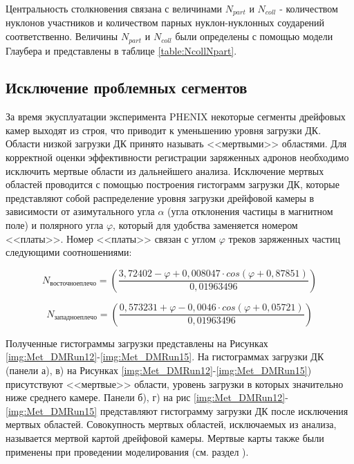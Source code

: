 Центральность столкновения связана с величинами $N_{part}$ и $N_{coll}$ - количеством нуклонов участников и количеством парных нуклон-нуклонных соударений соответственно. Величины $N_{part}$ и $N_{coll}$ были определены с помощью модели Глаубера и представлены в таблице \ref{table:NcollNpart}.

\subsection{Исключение проблемных сегментов} \label{sect3_DM}
За время экусплуатации эксперимента PHENIX некоторые сегменты дрейфовых камер выходят из строя, что приводит к уменьшению уровня загрузки ДК. Области низкой загрузки ДК принято называть <<мертвыми>> областями. 
Для корректной оценки эффективности регистрации заряженных адронов необходимо исключить мертвые области из дальнейшего анализа. 
Исключение мертвых областей проводится с помощью построения гистограмм загрузки ДК, которые представляют собой распределение уровня загрузки дрейфовой камеры в зависимости от азимутального угла $\alpha$ (угла отклонения частицы в магнитном поле) и полярного угла $\varphi$, который для удобства заменяется номером <<платы>>. Номер <<платы>> связан с углом $\varphi$ треков заряженных частиц следующими соотношениями: 

\begin{equation}
	N_{восточное плечо} = \left( \frac{3,72402 - \varphi + 0,008047 \cdot cos(\varphi + 0,87851)}{0,01963496} \right)
\end{equation}


\begin{equation}
	N_{западное плечо} = \left( \frac{0,573231 + \varphi - 0,0046 \cdot cos(\varphi + 0,05721)}{0,01963496} \right)
\end{equation}

Полученные гистограммы загрузки представлены на Рисунках \ref{img:Met_DMRun12}-\ref{img:Met_DMRun15}. 
На гистограммах загрузки ДК (панели а), в) на Рисунках \ref{img:Met_DMRun12}-\ref{img:Met_DMRun15}) присутствуют <<мертвые>> области, уровень загрузки в которых значительно ниже среднего камере. 
Панели б), г) на рис \ref{img:Met_DMRun12}-\ref{img:Met_DMRun15} представляют гистограмму загрузки ДК после исключения мертвых областей. 
Совокупность мертвых областей, исключаемых из анализа, называется мертвой картой дрейфовой камеры. Мертвые карты также были применены при проведении моделирования (см. раздел \label{sect3:EffRec}).


